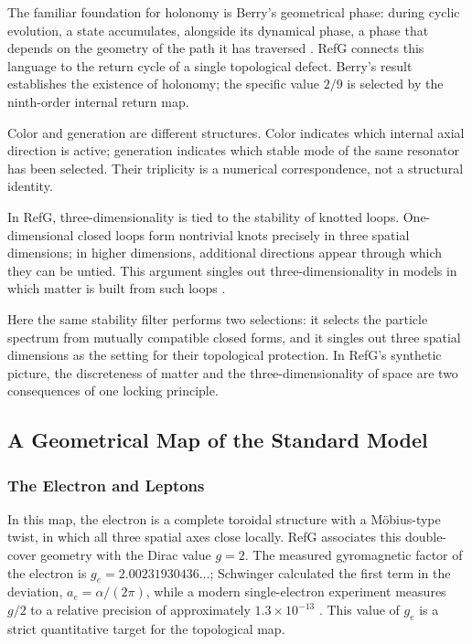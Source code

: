 \documentclass[11pt,a4paper]{article}
\begin{document}
The familiar foundation for holonomy is Berry's geometrical phase: during cyclic evolution, a state accumulates, alongside its dynamical phase, a phase that depends on the geometry of the path it has traversed \citep{berry1984}. RefG connects this language to the return cycle of a single topological defect. Berry's result establishes the existence of holonomy; the specific value $2/9$ is selected by the ninth-order internal return map.

Color and generation are different structures. Color indicates which internal axial direction is active; generation indicates which stable mode of the same resonator has been selected. Their triplicity is a numerical correspondence, not a structural identity.

In RefG, three-dimensionality is tied to the stability of knotted loops. One-dimensional closed loops form nontrivial knots precisely in three spatial dimensions; in higher dimensions, additional directions appear through which they can be untied. This argument singles out three-dimensionality in models in which matter is built from such loops \citep{ehrenfest1918,whitrow1955,berera2017}.

Here the same stability filter performs two selections: it selects the particle spectrum from mutually compatible closed forms, and it singles out three spatial dimensions as the setting for their topological protection. In RefG's synthetic picture, the discreteness of matter and the three-dimensionality of space are two consequences of one locking principle.

\subsection{A Geometrical Map of the Standard Model}

\subsubsection{The Electron and Leptons}

In this map, the electron is a complete toroidal structure with a Möbius-type twist, in which all three spatial axes close locally. RefG associates this double-cover geometry with the Dirac value $g=2$. The measured gyromagnetic factor of the electron is $g_e=2.00231930436\ldots$; Schwinger calculated the first term in the deviation, $a_e=\alpha/(2\pi)$, while a modern single-electron experiment measures $g/2$ to a relative precision of approximately $1.3\times10^{-13}$ \citep{schwinger1948,fan2023}. This value of $g_e$ is a strict quantitative target for the topological map.
\end{document}
